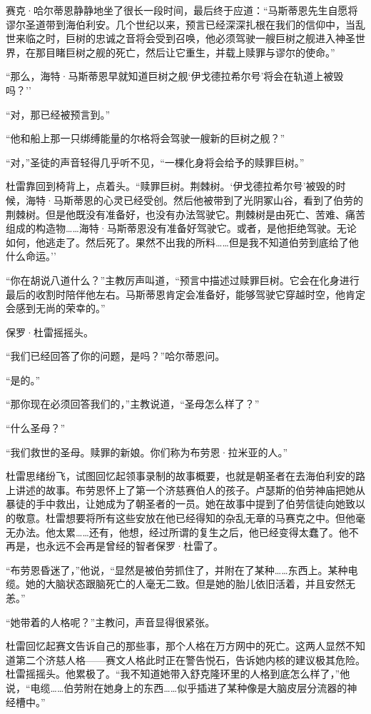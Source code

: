 \documentclass[AutoFakeBold=true]{book}
\begin{document}
赛克·哈尔蒂恩静静地坐了很长一段时间，最后终于应道：``马斯蒂恩先生自愿将谬尔圣道带到海伯利安。几个世纪以来，预言已经深深扎根在我们的信仰中，当乱世来临之时，巨树的忠诚之音将会受到召唤，他必须驾驶一艘巨树之舰进入神圣世界，在那目睹巨树之舰的死亡，然后让它重生，并载上赎罪与谬尔的使命。''

``那么，海特·马斯蒂恩早就知道巨树之舰`伊戈德拉希尔号'将会在轨道上被毁吗？''

``对，那已经被预言到。''

``他和船上那一只绑缚能量的尔格将会驾驶一艘新的巨树之舰？''

``对，''圣徒的声音轻得几乎听不见，``一棵化身将会给予的赎罪巨树。''

杜雷靠回到椅背上，点着头。``赎罪巨树。荆棘树。`伊戈德拉希尔号'被毁的时候，海特·马斯蒂恩的心灵已经受创。然后他被带到了光阴冢山谷，看到了伯劳的荆棘树。但是他既没有准备好，也没有办法驾驶它。荆棘树是由死亡、苦难、痛苦组成的构造物……海特·马斯蒂恩没有准备好驾驶它。或者，是他拒绝驾驶。无论如何，他逃走了。然后死了。果然不出我的所料……但是我不知道伯劳到底给了他什么命运。''

``你在胡说八道什么？''主教厉声叫道，``预言中描述过赎罪巨树。它会在化身进行最后的收割时陪伴他左右。马斯蒂恩肯定会准备好，能够驾驶它穿越时空，他肯定会感到无尚的荣幸的。''

保罗·杜雷摇摇头。

``我们已经回答了你的问题，是吗？''哈尔蒂恩问。

``是的。''

``那你现在必须回答我们的，''主教说道，``圣母怎么样了？''

``什么圣母？''

``我们救世的圣母。赎罪的新娘。你们称为布劳恩·拉米亚的人。''

杜雷思绪纷飞，试图回忆起领事录制的故事概要，也就是朝圣者在去海伯利安的路上讲述的故事。布劳恩怀上了第一个济慈赛伯人的孩子。卢瑟斯的伯劳神庙把她从暴徒的手中救出，让她成为了朝圣者的一员。她在故事中提到了伯劳信徒向她致以的敬意。杜雷想要将所有这些安放在他已经得知的杂乱无章的马赛克之中。但他毫无办法。他太累……还有，他想，经过所谓的复生之后，他已经变得太蠢了。他不再是，也永远不会再是曾经的智者保罗·杜雷了。

``布劳恩昏迷了，''他说，``显然是被伯劳抓住了，并附在了某种……东西上。某种电缆。她的大脑状态跟脑死亡的人毫无二致。但是她的胎儿依旧活着，并且安然无恙。''

``她带着的人格呢？''主教问，声音显得很紧张。

杜雷回忆起赛文告诉自己的那些事，那个人格在万方网中的死亡。这两人显然不知道第二个济慈人格——赛文人格此时正在警告悦石，告诉她内核的建议极其危险。杜雷摇摇头。他累极了。``我不知道她带入舒克隆环里的人格到底怎么样了，''他说，``电缆……伯劳附在她身上的东西……似乎插进了某种像是大脑皮层分流器的神经槽中。''
\end{document}
